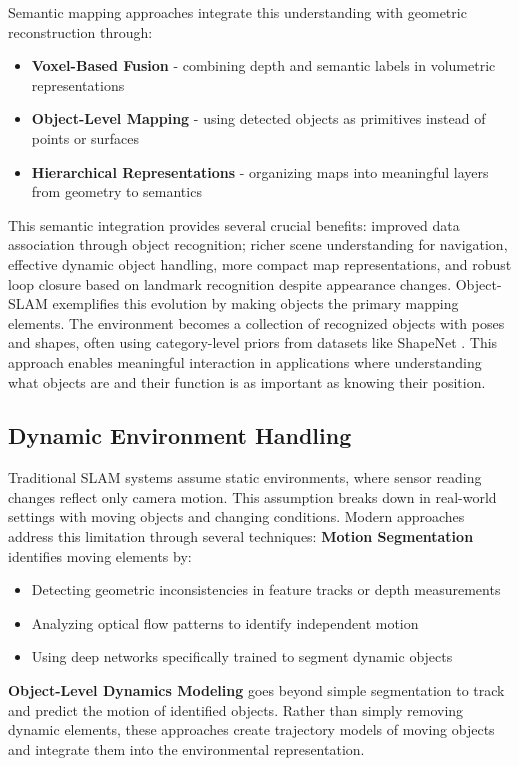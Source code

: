 \documentclass[12pt]{article}
\begin{document}
    \newpage
    Semantic mapping approaches integrate this understanding with geometric reconstruction through:
    \begin{itemize}
    \item \textbf{Voxel-Based Fusion} - combining depth and semantic labels in volumetric representations
    \item \textbf{Object-Level Mapping} - using detected objects as primitives instead of points or surfaces
    \item \textbf{Hierarchical Representations} - organizing maps into meaningful layers from geometry to semantics
    \end{itemize}
    This semantic integration provides several crucial benefits: improved data association through object recognition; richer scene understanding for navigation, effective dynamic object handling, more compact map representations, and robust loop closure 
    based on landmark recognition despite appearance changes.
    Object-SLAM exemplifies this evolution by making objects the primary mapping elements. The environment becomes a collection of recognized objects with poses and shapes, often using category-level priors from datasets like ShapeNet \cite{shapenet}. 
    This approach enables meaningful interaction in applications where understanding what objects are and their function is as important as knowing their position.

    \newpage
    \subsection{Dynamic Environment Handling}
    Traditional SLAM systems assume static environments, where sensor reading changes reflect only camera motion. This assumption breaks down in real-world settings with moving objects and changing conditions. Modern approaches address this limitation 
    through several techniques:
    \textbf{Motion Segmentation} identifies moving elements by:
    \begin{itemize}
    \item Detecting geometric inconsistencies in feature tracks or depth measurements
    \item Analyzing optical flow patterns to identify independent motion
    \item Using deep networks specifically trained to segment dynamic objects
    \end{itemize}
    \textbf{Object-Level Dynamics Modeling} goes beyond simple segmentation to track and predict the motion of identified objects. Rather than simply removing dynamic elements, these approaches create trajectory models of moving objects and 
    integrate them into the environmental representation.
    
\end{document}
